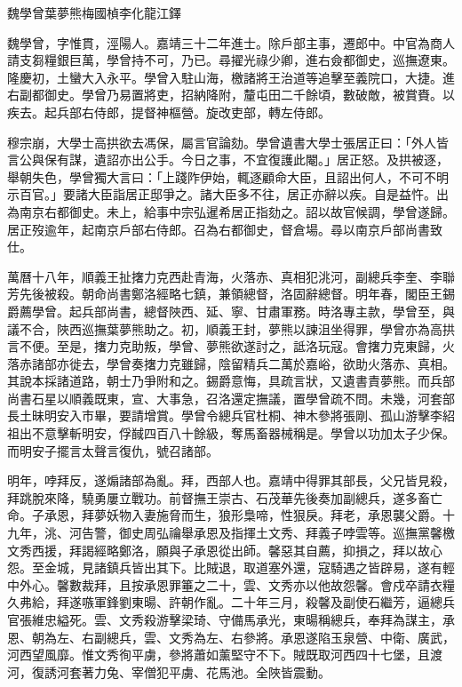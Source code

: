 
\begin{pinyinscope}
魏學曾葉夢熊梅國楨李化龍江鐸

魏學曾，字惟貫，涇陽人。嘉靖三十二年進士。除戶部主事，遷郎中。中官為商人請支芻糧銀巨萬，學曾持不可，乃已。尋擢光祿少卿，進右僉都御史，巡撫遼東。隆慶初，土蠻大入永平。學曾入駐山海，檄諸將王治道等追擊至義院口，大捷。進右副都御史。學曾乃易置將吏，招納降附，釐屯田二千餘頃，數破敵，被賞賚。以疾去。起兵部右侍郎，提督神樞營。旋改吏部，轉左侍郎。

穆宗崩，大學士高拱欲去馮保，屬言官論劾。學曾遺書大學士張居正曰：「外人皆言公與保有謀，遺詔亦出公手。今日之事，不宜復護此閹。」居正怒。及拱被逐，舉朝失色，學曾獨大言曰：「上踐阼伊始，輒逐顧命大臣，且詔出何人，不可不明示百官。」要諸大臣詣居正邸爭之。諸大臣多不往，居正亦辭以疾。自是益忤。出為南京右都御史。未上，給事中宗弘暹希居正指劾之。詔以故官候調，學曾遂歸。居正歿逾年，起南京戶部右侍郎。召為右都御史，督倉場。尋以南京戶部尚書致仕。

萬曆十八年，順義王扯撦力克西赴青海，火落赤、真相犯洮河，副總兵李奎、李聯芳先後被殺。朝命尚書鄭洛經略七鎮，兼領總督，洛固辭總督。明年春，閣臣王錫爵薦學曾。起兵部尚書，總督陜西、延、寧、甘肅軍務。時洛專主款，學曾至，與議不合，陜西巡撫葉夢熊助之。初，順義王封，夢熊以諫沮坐得罪，學曾亦為高拱言不便。至是，撦力克助叛，學曾、夢熊欲遂討之，詆洛玩寇。會撦力克東歸，火落赤諸部亦徙去，學曾奏撦力克雖歸，陰留精兵二萬於嘉峪，欲助火落赤、真相。其說本採諸道路，朝士乃爭附和之。錫爵意悔，具疏言狀，又遺書責夢熊。而兵部尚書石星以順義既東，宣、大事急，召洛還定撫議，置學曾疏不問。未幾，河套部長土昧明安入市畢，要請增賞。學曾令總兵官杜桐、神木參將張剛、孤山游擊李紹祖出不意擊斬明安，俘馘四百八十餘級，奪馬畜器械稱是。學曾以功加太子少保。而明安子擺言太聲言復仇，號召諸部。

明年，哱拜反，遂煽諸部為亂。拜，西部人也。嘉靖中得罪其部長，父兄皆見殺，拜跳脫來降，驍勇屢立戰功。前督撫王崇古、石茂華先後奏加副總兵，遂多畜亡命。子承恩，拜夢妖物入妻施脅而生，狼形梟啼，性狠戾。拜老，承恩襲父爵。十九年，洮、河告警，御史周弘禴舉承恩及指揮土文秀、拜義子哱雲等。巡撫黨馨檄文秀西援，拜謁經略鄭洛，願與子承恩從出師。馨惡其自薦，抑損之，拜以故心怨。至金城，見諸鎮兵皆出其下。比賊退，取道塞外還，寇騎遇之皆辟易，遂有輕中外心。馨數裁拜，且按承恩罪箠之二十，雲、文秀亦以他故怨馨。會戍卒請衣糧久弗給，拜遂嗾軍鋒劉東暘、許朝作亂。二十年三月，殺馨及副使石繼芳，逼總兵官張維忠縊死。雲、文秀殺游擊梁琦、守備馬承光，東暘稱總兵，奉拜為謀主，承恩、朝為左、右副總兵，雲、文秀為左、右參將。承恩遂陷玉泉營、中衛、廣武，河西望風靡。惟文秀徇平虜，參將蕭如薰堅守不下。賊既取河西四十七堡，且渡河，復誘河套著力兔、宰僧犯平虜、花馬池。全陜皆震動。


\end{pinyinscope}
